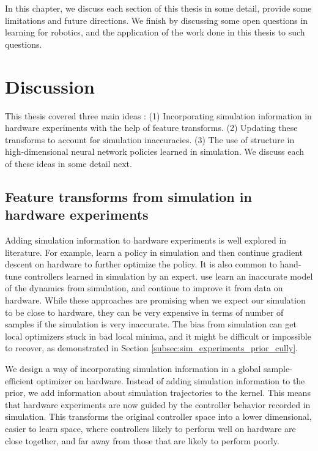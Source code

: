 In this chapter, we discuss each section of this thesis in some detail, provide some limitations and future directions. We finish by discussing some open questions in learning for robotics, and the application of the work done in this thesis to such questions.

\section{Discussion}
This thesis covered three main ideas : (1) Incorporating simulation information in hardware experiments with the help of feature transforms. (2) Updating these transforms to account for simulation inaccuracies. (3) The use of structure in high-dimensional neural network policies learned in simulation. 
We discuss each of these ideas in some detail next.

\subsection{Feature transforms from simulation in hardware experiments}

Adding simulation information to hardware experiments is well explored in literature. For example, \cite{endo2008learning} learn a policy in simulation and then continue gradient descent on hardware to further optimize the policy. It is also common to hand-tune controllers learned in simulation by an expert.  \cite{abbeel2006using} use learn an inaccurate model of the dynamics from simulation, and continue to improve it from data on hardware. While these approaches are promising when we expect our simulation to be close to hardware, they can be very expensive in terms of number of samples if the simulation is very inaccurate. The bias from simulation can get local optimizers stuck in bad local minima, and it might be difficult or impossible to recover, as demonstrated in Section \ref{subsec:sim_experiments_prior_cully}.

We design a way of incorporating simulation information in a global sample-efficient optimizer on hardware. Instead of adding simulation information to the prior, we add information about simulation trajectories to the kernel. This means that hardware experiments are now guided by the controller behavior recorded in simulation. This transforms the original controller space into a lower dimensional, easier to learn space, where controllers likely to perform well on hardware are close together, and far away from those that are likely to perform poorly.

